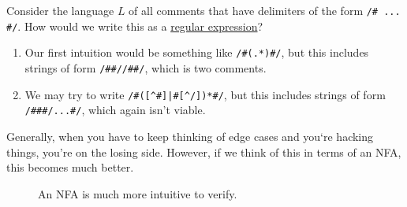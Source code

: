   \begin{example}
    \label{ex:nfas-are-more-verifiable-to-humans}
    Consider the language $L$ of all comments that have delimiters of the form \texttt{/\# ... \#/}. How would we write this as a \hyperref[def:regular_expression]{regular expression}? 
    \begin{enumerate}
      \item Our first intuition would be something like \texttt{/\#(.*)\#/}, but this includes strings of form \texttt{/\#\#//\#\#/}, which is two comments. 
      \item We may try to write \texttt{/\#([\^{}\#]|\#[\^{}/])*\#/}, but this includes strings of form \texttt{/\#\#\#/...\#/}, which again isn't viable. 
    \end{enumerate}
    Generally, when you have to keep thinking of edge cases and you`re hacking things, you're on the losing side. However, if we think of this in terms of an NFA, this becomes much better. 

    \begin{figure}[H]
      \centering
      \caption{An NFA is much more intuitive to verify.}
      \label{fig:nfa_original_texttt}
    \end{figure}
  \end{example}

